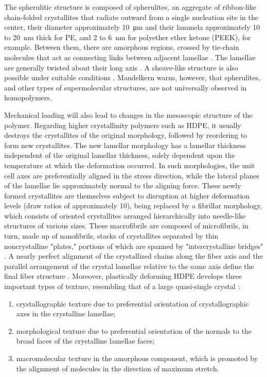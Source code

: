 The spherulitic structure is composed of spherulites, an aggregate of ribbon-like chain-folded crystallites that radiate outward from a single nucleation site in the center, their diameter approximately \SI{10}{\micro\meter} and their lammela approximately 10 to \SI{20}{\nano\meter} thick for PE, and 2 to \SI{6}{\nano\meter} for polyether ether ketone (PEEK), for example.
Between them, there are amorphous regions, crossed by tie-chain molecules that act as connecting links between adjacent lamellae \citep{callister2014materials, khouryMorphologyCrystallineSynthetic1976, pouriayevaliConstitutiveDescriptionRatesensitive2013, gsellEvolutionMicrostructureSemicrystalline1994}.
The lamellae are generally twisted about their long axis \citep{patlazhanStructuralMechanicsSemicrystalline2012}.
A sheave-like structure is also possible under suitable conditions \citep{peacockHandbookPolyethyleneStructures2014}.
Mandelkern \citep{mandelkernCrystallinePolymerReminiscences2006} warns, however, that spherulites, and other types of supermolecular structures, are not universally observed in homopolymers.

Mechanical loading will also lead to changes in the mesoscopic structure of the polymer.
Regarding higher crystallinity polymers such as HDPE, it usually destroys the crystallites of the original morphology, followed by reordering to form new crystallites.
The new lamellar morphology has a lamellar thickness independent of the original lamellar thickness, solely dependent upon the temperature at which the deformation occurred.
In such morphologies, the unit cell axes are preferentially aligned in the stress direction, while the lateral planes of the lamellae lie approximately normal to the aligning force.
These newly formed crystallites are themselves subject to disruption at higher deformation levels (draw ratios of approximately 10), being replaced by a fibrillar morphology, which consists of oriented crystallites arranged hierarchically into needle-like structures of various sizes.
These macrofibrils are composed of microfibrils, in turn, made up of nanofibrils, stacks of crystallites separated by thin noncrystalline "plates," portions of which are spanned by "intercrystalline bridges" \citep{peacockHandbookPolyethyleneStructures2014}.
A nearly perfect alignment of the crystallized chains along the fiber axis and the parallel arrangement of the crystal lamellae relative to the same axis define the final fiber structure \citep{peterlinMolecularModelDrawing1971}.
Moreover, plastically deforming HDPE develops three important types of texture, resembling that of a large quasi-single crystal \citep{argonPhysicsDeformationFracture2013a}:
\begin{enumerate}
	\item crystallographic texture due to preferential orientation of crystallographic axes in the crystalline lamellae;
	\item morphological texture due to preferential orientation of the normals to the broad faces of the crystalline lamellae faces;
	\item macromolecular texture in the amorphous component, which is promoted by the alignment of molecules in the direction of maximum stretch.
\end{enumerate}

